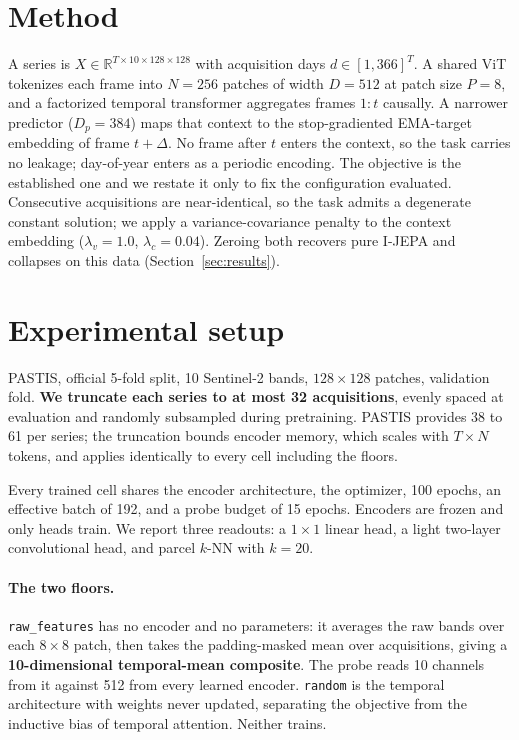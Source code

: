 \documentclass{article}
\begin{document}
\section{Method}

A series is $X \in \mathbb{R}^{T \times 10 \times 128 \times 128}$ with acquisition days
$d \in [1,366]^{T}$. A shared ViT tokenizes each frame into $N{=}256$ patches of width $D{=}512$ at
patch size $P{=}8$, and a factorized temporal transformer aggregates frames $1{:}t$ causally. A
narrower predictor ($D_p{=}384$) maps that context to the stop-gradiented EMA-target embedding of
frame $t{+}\Delta$. No frame after $t$ enters the context, so the task carries no leakage; day-of-year
enters as a periodic encoding. The objective is the established one \citep{oord2018cpc,
bardes2024vjepa, lee2026cfjepa} and we restate it only to fix the configuration evaluated.
Consecutive acquisitions are near-identical, so the task admits a degenerate constant solution; we
apply a variance-covariance penalty \citep{bardes2022vicreg} to the context embedding
($\lambda_v{=}1.0$, $\lambda_c{=}0.04$). Zeroing both recovers pure I-JEPA \citep{assran2023ijepa}
and collapses on this data (Section~\ref{sec:results}).

\section{Experimental setup}
\label{sec:setup}

PASTIS, official 5-fold split, 10 Sentinel-2 bands, $128{\times}128$ patches, validation fold.
\textbf{We truncate each series to at most 32 acquisitions}, evenly spaced at evaluation and randomly
subsampled during pretraining. PASTIS provides 38 to 61 per series; the truncation bounds encoder memory, which scales with
$T{\times}N$ tokens, and applies identically to every cell including the floors.

Every trained cell shares the encoder architecture, the optimizer, 100 epochs, an effective batch of
192, and a probe budget of 15 epochs. Encoders are frozen and only heads train. We report three
readouts: a $1{\times}1$ linear head, a light two-layer convolutional head, and parcel $k$-NN with
$k{=}20$.

\paragraph{The two floors.} \texttt{raw\_features} has no encoder and no parameters: it averages the
raw bands over each $8{\times}8$ patch, then takes the padding-masked mean over acquisitions, giving a
\textbf{10-dimensional temporal-mean composite}. The probe reads 10 channels from it against 512 from
every learned encoder. \texttt{random} is the temporal architecture with weights never updated,
separating the objective from the inductive bias of temporal attention. Neither trains.
\end{document}
